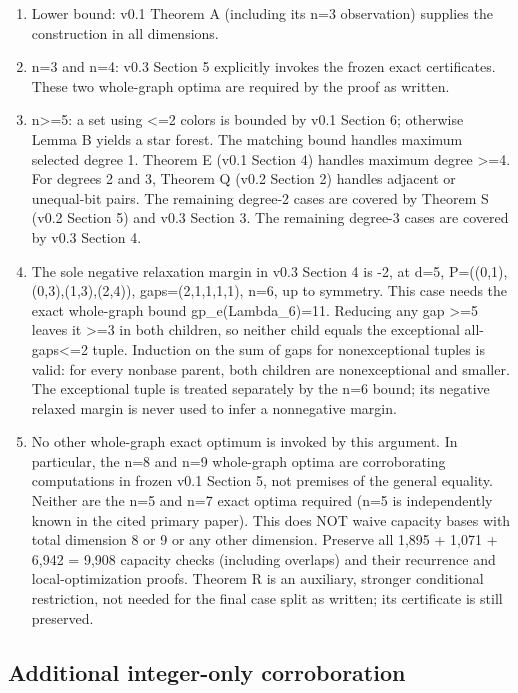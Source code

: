 \documentclass[
  10pt,
]{article}
\providecommand{\tightlist}{%
  \setlength{\itemsep}{0pt}\setlength{\parskip}{0pt}}
\begin{document}
\begin{enumerate}
\def\labelenumi{\arabic{enumi}.}
\tightlist
\item
  Lower bound: v0.1 Theorem A (including its n=3 observation) supplies
  the construction in all dimensions.
\item
  n=3 and n=4: v0.3 Section 5 explicitly invokes the frozen exact
  certificates. These two whole-graph optima are required by the proof
  as written.
\item
  n\textgreater=5: a set using \textless=2 colors is bounded by v0.1
  Section 6; otherwise Lemma B yields a star forest. The matching bound
  handles maximum selected degree 1. Theorem E (v0.1 Section 4) handles
  maximum degree \textgreater=4. For degrees 2 and 3, Theorem Q (v0.2
  Section 2) handles adjacent or unequal-bit pairs. The remaining
  degree-2 cases are covered by Theorem S (v0.2 Section 5) and v0.3
  Section 3. The remaining degree-3 cases are covered by v0.3 Section 4.
\item
  The sole negative relaxation margin in v0.3 Section 4 is -2, at d=5,
  P=((0,1),(0,3),(1,3),(2,4)), gaps=(2,1,1,1,1), n=6, up to symmetry.
  This case needs the exact whole-graph bound gp\_e(Lambda\_6)=11.
  Reducing any gap \textgreater=5 leaves it \textgreater=3 in both
  children, so neither child equals the exceptional all-gaps\textless=2
  tuple. Induction on the sum of gaps for nonexceptional tuples is
  valid: for every nonbase parent, both children are nonexceptional and
  smaller. The exceptional tuple is treated separately by the n=6 bound;
  its negative relaxed margin is never used to infer a nonnegative
  margin.
\item
  No other whole-graph exact optimum is invoked by this argument. In
  particular, the n=8 and n=9 whole-graph optima are corroborating
  computations in frozen v0.1 Section 5, not premises of the general
  equality. Neither are the n=5 and n=7 exact optima required (n=5 is
  independently known in the cited primary paper). This does NOT waive
  capacity bases with total dimension 8 or 9 or any other dimension.
  Preserve all 1,895 + 1,071 + 6,942 = 9,908 capacity checks (including
  overlaps) and their recurrence and local-optimization proofs. Theorem
  R is an auxiliary, stronger conditional restriction, not needed for
  the final case split as written; its certificate is still preserved.
\end{enumerate}

\subsection{Additional integer-only
corroboration}\label{additional-integer-only-corroboration}
\end{document}
